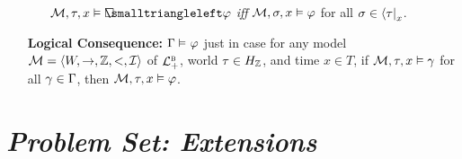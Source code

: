 \documentclass[a4paper, 11pt]{article} %
\begin{document}
\begin{enumerate}[leftmargin=1.2in]
\begin{itemize}[leftmargin=.15in]
      \item[] $\M,\tau,x \vDash \Openpast \varphi$ \textit{iff} $\M,\sigma,x \vDash \varphi$ for all $\sigma \in \bra{\tau}_x$.
    \end{itemize}
  \item[\bf Logical Consequence:] $\MetaG \MLmodels[] \metaA$ just in case for any model $\M = \tuple{W, \to, \Z, <, \I}$ of $\BLP$, world $\tau \in H_\Z$, and time $x \in T$, if $\M, \tau, x \vDash \metaG$ for all $\metaG \in \MetaG$, then $\M, \tau, x \vDash \metaA$.
\end{enumerate}



\section*{\it Problem Set: Extensions}
\end{document}
